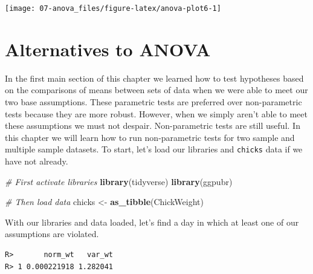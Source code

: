 \documentclass[english,10pt,a4paper,oneside]{book}
\newenvironment{Shaded}{\begin{snugshade}}{\end{snugshade}}
\newcommand{\CommentTok}[1]{\textcolor[rgb]{0.56,0.35,0.01}{\textit{#1}}}
\newcommand{\DataTypeTok}[1]{\textcolor[rgb]{0.13,0.29,0.53}{#1}}
\newcommand{\DecValTok}[1]{\textcolor[rgb]{0.00,0.00,0.81}{#1}}
\newcommand{\KeywordTok}[1]{\textcolor[rgb]{0.13,0.29,0.53}{\textbf{#1}}}
\newcommand{\NormalTok}[1]{#1}
\newcommand{\OperatorTok}[1]{\textcolor[rgb]{0.81,0.36,0.00}{\textbf{#1}}}
\newcommand{\StringTok}[1]{\textcolor[rgb]{0.31,0.60,0.02}{#1}}
\theoremstyle{definition}
\theoremstyle{definition}
\theoremstyle{definition}
\theoremstyle{remark}
\begin{document}
\texttt{[image: 07-anova\_files/figure-latex/anova-plot6-1]}

\hypertarget{alternatives-to-anova}{%
\section{Alternatives to ANOVA}\label{alternatives-to-anova}}

In the first main section of this chapter we learned how to test
hypotheses based on the comparisons of means between sets of data when
we were able to meet our two base assumptions. These parametric tests
are preferred over non-parametric tests because they are more robust.
However, when we simply aren't able to meet these assumptions we must
not despair. Non-parametric tests are still useful. In this chapter we
will learn how to run non-parametric tests for two sample and multiple
sample datasets. To start, let's load our libraries and \texttt{chicks}
data if we have not already.

\begin{Shaded}
\begin{Highlighting}[]
\CommentTok{# First activate libraries}
\KeywordTok{library}\NormalTok{(tidyverse)}
\KeywordTok{library}\NormalTok{(ggpubr)}

\CommentTok{# Then load data}
\NormalTok{chicks <-}\StringTok{ }\KeywordTok{as_tibble}\NormalTok{(ChickWeight)}
\end{Highlighting}
\end{Shaded}

With our libraries and data loaded, let's find a day in which at least
one of our assumptions are violated.

\begin{Shaded}
\end{Shaded}

\begin{verbatim}
R>       norm_wt   var_wt
R> 1 0.000221918 1.282041
\end{verbatim}
\end{document}
